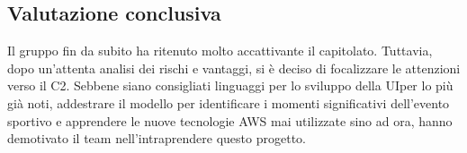 \subsection{Valutazione conclusiva}
Il gruppo fin da subito ha ritenuto molto accattivante il capitolato. Tuttavia, dopo un'attenta analisi dei rischi e vantaggi, si è deciso di focalizzare le attenzioni verso il C2. Sebbene siano consigliati linguaggi per lo sviluppo della UI\glo per lo più già noti, addestrare il modello per identificare i momenti significativi dell'evento sportivo e apprendere le nuove tecnologie AWS mai utilizzate sino ad ora, hanno demotivato il team nell'intraprendere questo progetto.
